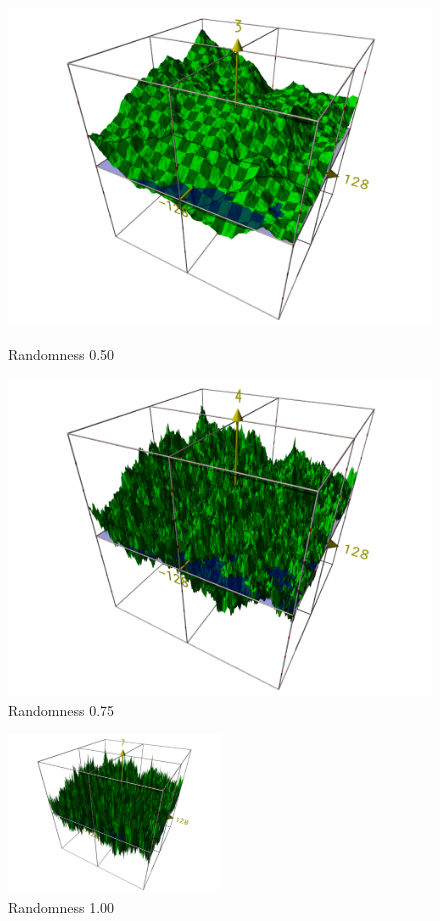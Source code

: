 \documentclass[
	12pt,
	a4paper,
	BCOR10mm,
	DIV14,
	headsepline,
]{scrreprt}
\begin{document}
\begin{figure}[H]
  \centering
  \begin{minipage}[b]{0.49\textwidth}
    \includegraphics[width=\textwidth]{050.png}
    \caption{Randomness 0.50}
	\label{050}
  \end{minipage}
  \hfill
  \begin{minipage}[b]{0.49\textwidth}
    \includegraphics[width=\textwidth]{075.png}
    \caption{Randomness 0.75}
	\label{075}
  \end{minipage}
\end{figure}

\begin{figure}[H]
	\centering
	\includegraphics[width=0.5\textwidth]{100.png}
	\caption{Randomness 1.00}
	\label{100}
\end{figure}
\end{document}
